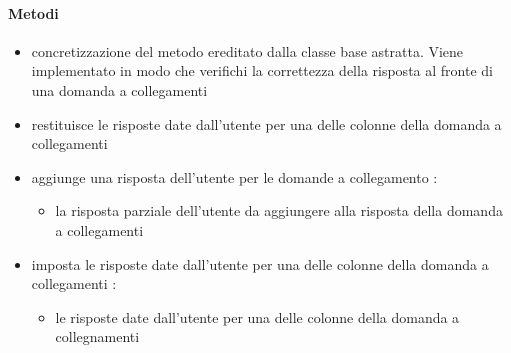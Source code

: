 \paragraph{Metodi}
\begin{itemize}
\item {}
\newline
concretizzazione del metodo ereditato dalla classe base astratta. Viene implementato in modo che verifichi la correttezza della risposta al fronte di una domanda a collegamenti
\newline
\item {}
\newline
restituisce le risposte date dall'utente per una delle colonne della domanda a collegamenti
\newline
\item {}
\newline
aggiunge una risposta dell'utente per le domande a collegamento
\newline
{} :
\begin{itemize}
\item {}
\newline
la risposta parziale dell'utente da aggiungere alla risposta della domanda a collegamenti
\end{itemize}
\item {}
\newline
imposta le risposte date dall'utente per una delle colonne della domanda a collegamenti
\newline
{} :
\begin{itemize}
\item {}
\newline
le risposte date dall'utente per una delle colonne della domanda a collegnamenti
\end{itemize}
\end{itemize}
